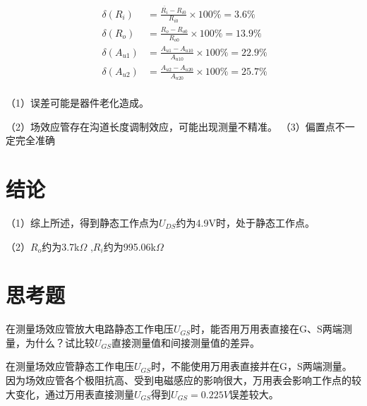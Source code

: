 \documentclass{article}
\begin{document}
\begin{align*}
	\ \delta (R_i)&=\frac{\overline{R_i}-R_{i0}}{R_{i0}} \times 100\%=3.6\%\\
	\ \delta (R_o)&=\frac{{R_o}-R_{o0}}{R_{o0}} \times 100\%=13.9\%\\
	\ \delta (A_{u1})&=\frac{{A_{u1}}-A_{u10}}{A_{u10}} \times 100\%=22.9\%\\
	\ \delta (A_{u2})&=\frac{{A_{u2}}-A_{u20}}{A_{u20}} \times 100\%=25.7\%\\
\end{align*}    \par
（1）误差可能是器件老化造成。\par
（2）场效应管存在沟道长度调制效应，可能出现测量不精准。
（3）偏置点不一定完全准确
\section{结论}
（1）综上所述，得到静态工作点为$U_{DS}$约为4.9V时，处于静态工作点。\par
（2）$R_o$约为3.7k$\Omega$ ,$R_i$约为995.06k$\Omega$

\section{思考题}
在测量场效应管放大电路静态工作电压$U_{GS}$时，能否用万用表直接在G、S两端测量，为什么？试比较$U_{GS}$直接测量值和间接测量值的差异。\par
在测量场效应管静态工作电压$U_{GS}$时，不能使用万用表直接并在G，S两端测量。因为场效应管各个极阻抗高、受到电磁感应的影响很大，万用表会影响工作点的较大变化，通过万用表直接测量$U_{GS}$得到$U_{GS}=0.225V$误差较大。
\end{document}
